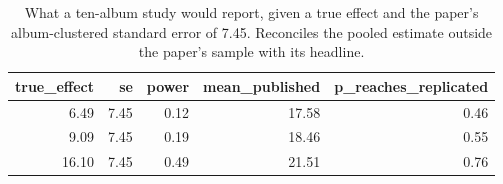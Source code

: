 \begin{table}
\caption{What a ten-album study would report, given a true effect and the paper's album-clustered standard error of 7.45. Reconciles the pooled estimate outside the paper's sample with its headline.}
\begin{tabular}{rrrrr}
\toprule
true\_effect & se & power & mean\_published & p\_reaches\_replicated \\
\midrule
6.49 & 7.45 & 0.12 & 17.58 & 0.46 \\
9.09 & 7.45 & 0.19 & 18.46 & 0.55 \\
16.10 & 7.45 & 0.49 & 21.51 & 0.76 \\
\bottomrule
\end{tabular}
\end{table}
